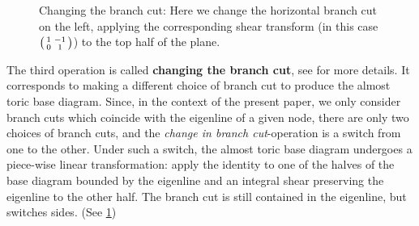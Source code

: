 \documentclass[12pt,a4paper,abstract=true,final]{scrartcl}
\begin{document}
\begin{figure}
  \centering
  \caption{Changing the branch cut: Here we change the horizontal branch cut on the left, applying the corresponding shear transform (in this case $\smqty(1 & -1\\ 0 &1)$) to the top half of the plane.}
  \label{fig:changing_the_branch_cut}
\end{figure}

The third operation is called \textbf{changing the branch cut}, see \cite[Sections 8.4]{evans2021atfs} for more details.
It corresponds to making a different choice of branch cut to produce the almost toric base diagram.
Since, in the context of the present paper, we only consider branch cuts which coincide with the eigenline of a given node, there are only two choices of branch cuts, and the \textit{change in branch cut}-operation is a switch from one to the other.
Under such a switch, the almost toric base diagram undergoes a piece-wise linear transformation: apply the identity to one of the halves of the base diagram bounded by the eigenline and an integral shear preserving the eigenline to the other half.
The branch cut is still contained in the eigenline, but switches sides. (See \cref{fig:changing_the_branch_cut})
\end{document}
